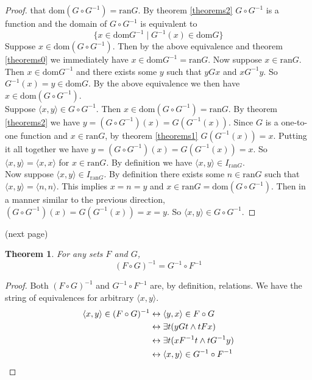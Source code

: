 \documentclass{report}
\newtheorem{theorem}[theo]{Theorem}
\begin{document}
\begin{proof}
that $\text{dom}(G\circ G^{-1})=\text{ran}G$. By theorem \ref{theorems2} $G\circ G^{-1}$ is a function and the domain of $G\circ G^{-1}$ is equivalent to
\begin{equation*}
\{x\in\text{dom}G^{-1}\mid G^{-1}(x)\in\text{dom}G\}
\end{equation*}
Suppose $x\in\text{dom}(G\circ G^{-1})$. Then by the above equivalence and theorem \ref{theorems0} we immediately have $x\in\text{dom}G^{-1}=\text{ran}G$. Now suppose $x\in\text{ran}G$. 
Then $x\in\text{dom}G^{-1}$ and there exists
some $y$ such that $yGx$ and $xG^{-1}y$. So $G^{-1}(x)=y\in\text{dom}G$. By the above equivalence
we then have $x\in\text{dom}(G\circ G^{-1})$.\\
\indent Suppose $\langle x,y\rangle\in G\circ G^{-1}$. Then $x\in\text{dom}(G\circ G^{-1})=\text{ran}G$. By theorem \ref{theorems2} we have $y=(G\circ G^{-1})(x)=G(G^{-1}(x))$. 
Since $G$ is a one-to-one function and $x\in\text{ran}G$, by theorem \ref{theorems1} $G(G^{-1}(x))=x$. Putting it all together we have $y=(G\circ G^{-1})(x)=G(G^{-1}(x))=x$. 
So $\langle x,y\rangle=\langle x,x\rangle$ for $x\in\text{ran}G$. By definition we have
$\langle x,y\rangle\in I_{\text{ran}G}$.\\
\indent Now suppose $\langle x,y\rangle\in I_{\text{ran}G}$. By definition there exists some $n\in\text{ran}G$ such that $\langle x,y\rangle=\langle n,n\rangle$.
This implies $x=n=y$ and $x\in\text{ran}G=\text{dom}(G\circ G^{-1})$.
Then in a manner similar to the previous direction, $(G\circ G^{-1})(x)=G(G^{-1}(x))=x=y$. So
$\langle x,y\rangle\in G\circ G^{-1}$.
\end{proof}
\noindent(next page)\newpage
\begin{theorem}
For any sets $F$ and $G$,
\begin{equation*}
(F\circ G)^{-1}=G^{-1}\circ F^{-1}
\end{equation*}
\end{theorem}
\begin{proof}
Both $(F\circ G)^{-1}$ and $G^{-1}\circ F^{-1}$ are, by definition, relations. We have the string of equivalences for arbitrary
$\langle x,y\rangle$.
\begin{align*}
\langle x,y\rangle\in(F\circ G)^{-1}&\leftrightarrow\langle y,x\rangle\in F\circ G\\
&\leftrightarrow\exists t(yGt\land tFx)\\
&\leftrightarrow\exists t(xF^{-1}t\land tG^{-1}y)\\
&\leftrightarrow\langle x,y\rangle\in G^{-1}\circ F^{-1}\qedhere
\end{align*}
\end{proof}
\end{document}
